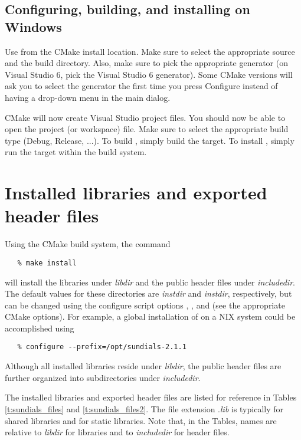 
\subsection{Configuring, building, and installing  on Windows}
Use  from the CMake install location.
Make sure to select the appropriate source and the build directory.
Also, make sure to pick the appropriate generator (on Visual Studio 6, 
pick the Visual Studio 6 generator). Some CMake versions will ask you 
to select the generator the first time you press Configure instead of 
having a drop-down menu in the main dialog. 

CMake will now create Visual Studio project files. You should now be able to 
open the {\sundials} project (or workspace) file. Make sure to select the appropriate 
build type (Debug, Release, ...). To build {\sundials}, simply build the 
target. To install {\sundials}, simply run the  target within the build system.


\section{Installed libraries and exported header files}

Using the CMake {\sundials} build system, the command
\begin{verbatim}
   % make install
\end{verbatim}
will install the libraries under {\em libdir} and the public header
files under {\em includedir}. The default values for these directories are
{\em instdir} and {\em instdir},
respectively, but can be changed using the configure script options
, ,  and  
(see the appropriate CMake options).  For example, a global installation
of {\sundials} on a {\sc *NIX} system could be accomplished using
\begin{verbatim}
   % configure --prefix=/opt/sundials-2.1.1
\end{verbatim}
Although all installed libraries reside under {\em libdir}, the public header files
are further organized into subdirectories under {\em includedir}.

The installed libraries and exported header files are listed for
reference in Tables \ref{t:sundials_files} and \ref{t:sundials_files2}.
The file extension .{\em lib}
is typically  for shared libraries and  for static libraries.
Note that, in the Tables, names are relative to {\em libdir}
for libraries and to {\em includedir} for header files.

